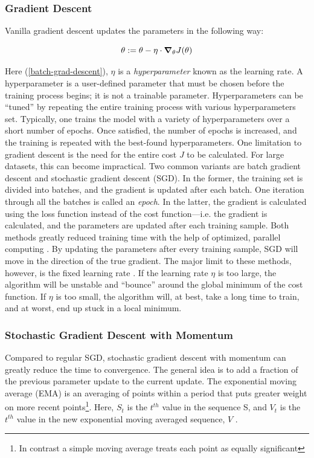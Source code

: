 \subsubsection{Gradient Descent}
Vanilla gradient descent \cite{gradient-descent-rev-article} updates the parameters in the following way:

\begin{equation}
    \label{batch-grad-descent}
    \theta := \theta - \eta \cdot \grad_\theta J(\theta)
\end{equation}

\noindent Here (\ref{batch-grad-descent}), $ \eta $ is a \textit{hyperparameter} known as the learning rate. A hyperparameter is a user-defined parameter that must be chosen before the training process begins; it is not a trainable parameter. Hyperparameters can be ``tuned'' by repeating the entire training process with various hyperparameters set. Typically, one trains the model with a variety of hyperparameters over a short number of epochs. Once satisfied, the number of epochs is increased, and the training is repeated with the best-found hyperparameters. One limitation to gradient descent is the need for the entire cost $ J $ to be calculated. For large datasets, this can become impractical. Two common variants are batch gradient descent and stochastic gradient descent (SGD). In the former, the training set is divided into batches, and the gradient is updated after each batch. One iteration through all the batches is called an \textit{epoch}. In the latter, the gradient is calculated using the loss function instead of the cost function---i.e. the gradient is calculated, and the parameters are updated after each training sample. Both methods greatly reduced training time with the help of optimized, parallel computing \cite{stoch-grad-desc-parallel}. By updating the parameters after every training sample, SGD will move in the direction of the true gradient. The major limit to these methods, however, is the fixed learning rate \cite{grad-desc-limits}. If the learning rate $ \eta $ is too large, the algorithm will be unstable and ``bounce'' around the global minimum of the cost function. If $ \eta $ is too small, the algorithm will, at best, take a long time to train, and at worst, end up stuck in a local minimum. 

\subsubsection{Stochastic Gradient Descent with Momentum}
Compared to regular SGD, stochastic gradient descent with momentum \cite{grad-desc-with-mom-orig} can greatly reduce the time to convergence. The general idea is to add a fraction of the previous parameter update to the current update. The exponential moving average (EMA) is an averaging of points within a period that puts greater weight on more recent points\footnote{In contrast a simple moving average treats each point as equally significant}. Here, $ S_t $ is the $ t^{th} $  value in the sequence S, and $ V_t $ is the $ t^{th} $  value in the new exponential moving averaged sequence, $ V $ .

